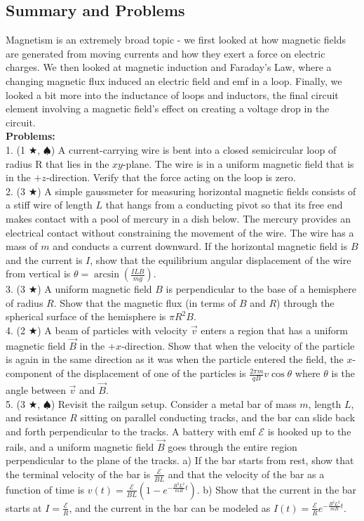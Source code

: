 \subsection{Summary and Problems}
Magnetism is an extremely broad topic - we first looked at how magnetic fields are generated from moving currents and how they exert a force on electric charges. We then looked at magnetic induction and Faraday's Law, where a changing magnetic flux induced an electric field and emf in a loop. Finally, we looked a bit more into the inductance of loops and inductors, the final circuit element involving a magnetic field's effect on creating a voltage drop in the circuit. \\

\noindent \textbf{Problems:}\\
1. (1 $\bigstar$, $\spadesuit$) A current-carrying wire is bent into a closed semicircular loop of radius R that lies in the $xy$-plane. The wire is in a uniform magnetic field that is in the $+z$-direction. Verify that the force acting on the loop is zero. \\
2. (3 $\bigstar$) A simple gaussmeter for measuring horizontal magnetic fields consists of a stiff wire of length $L$ that hangs from a conducting pivot so that its free end makes contact with a pool of mercury in a dish below. The mercury provides an electrical contact without constraining the movement of the wire. The wire has a mass of $m$ and conducts a current downward. If the horizontal magnetic field is $B$ and the current is $I$, show that the equilibrium angular displacement of the wire from vertical is $\theta = \arcsin  \left(\frac{ILB}{mg}\right)$.\\
3. (3 $\bigstar$) A uniform magnetic field $B$ is perpendicular to the base of a hemisphere of radius $R$. Show that the magnetic flux (in terms of $B$ and $R$) through the spherical surface of the hemisphere is $\pi R^2 B$. \\
4. (2 $\bigstar$) A beam of particles with velocity $\vec v$ enters a region that has a uniform magnetic field $\vec B$ in the $+x$-direction. Show that when the velocity of the particle is again in the same direction as it was when the particle entered the field, the $x$-component of the displacement of one of the particles is $\frac{2\pi m}{qB}v \cos \theta$ where $\theta$ is the angle between $\vec v$ and $\vec B$.\\
5. (3 $\bigstar$, $\spadesuit$) Revisit the railgun setup. Consider a metal bar of mass $m$, length $L$, and resistance $R$ sitting on parallel conducting tracks, and the bar can slide back and forth perpendicular to the tracks. A battery with emf $\mathscr E$ is hooked up to the rails, and a uniform magnetic field $\vec B$ goes through the entire region perpendicular to the plane of the tracks. a) If the bar starts from rest, show that the terminal velocity of the bar is $\frac{\mathscr{E}}{BL}$ and that the velocity of the bar as a function of time is $v(t) = \frac{\mathscr{E}}{BL}(1 - e^{-\frac{B^2L^2}{mR}t})$. b) Show that the current in the bar starts at $I = \frac{\mathscr{E}}{R}$, and the current in the bar can be modeled as $I(t) = \frac{\mathscr{E}}{R}e^{-\frac{B^2L^2}{mR}t}$.\\
